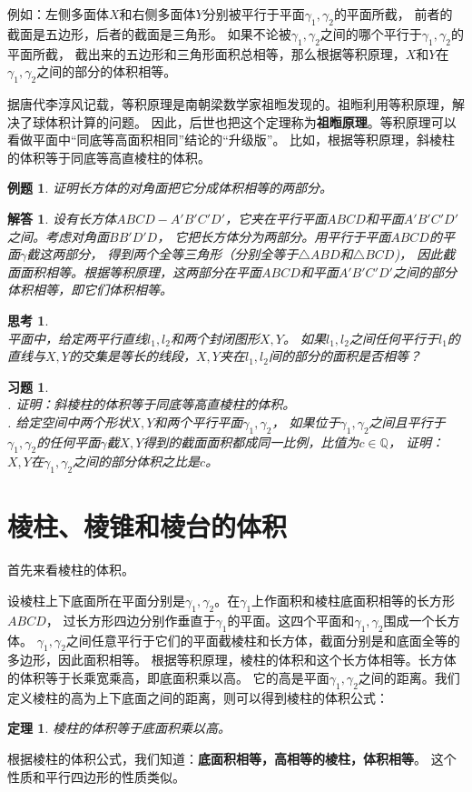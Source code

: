 \documentclass[12pt,UTF8]{ctexbook}
\newtheorem{tm}{定理}[section]
\newtheorem{et}{例题}[section]
\newtheorem{sk}{思考}[section]
\newtheorem*{so}{解答}
\newtheorem{xt}{习题}[section]
\begin{document}
例如：左侧多面体$X$和右侧多面体$Y$分别被平行于平面$\gamma_1,\gamma_2$的平面所截，
前者的截面是五边形，后者的截面是三角形。
如果不论被$\gamma_1,\gamma_2$之间的哪个平行于$\gamma_1,\gamma_2$的平面所截，
截出来的五边形和三角形面积总相等，那么根据等积原理，$X$和$Y$在$\gamma_1,\gamma_2$之间的部分的体积相等。

据唐代李淳风记载，等积原理是南朝梁数学家祖暅发现的。祖暅利用等积原理，解决了球体积计算的问题。
因此，后世也把这个定理称为\textbf{祖暅原理}。等积原理可以看做平面中“同底等高面积相同”结论的“升级版”。
比如，根据等积原理，斜棱柱的体积等于同底等高直棱柱的体积。
\begin{et}
    证明长方体的对角面把它分成体积相等的两部分。
\end{et}
\begin{so}
    设有长方体$ABCD-A'B'C'D'$，它夹在平行平面$ABCD$和平面$A'B'C'D'$之间。考虑对角面$BB'D'D$，
    它把长方体分为两部分。用平行于平面$ABCD$的平面$\gamma$截这两部分，
    得到两个全等三角形（分别全等于$\triangle ABD$和$\triangle BCD$)，
    因此截面面积相等。根据等积原理，这两部分在平面$ABCD$和平面$A'B'C'D'$之间的部分体积相等，即它们体积相等。
\end{so}
\begin{sk}
    \mbox{}\\
    平面中，给定两平行直线$l_1,l_2$和两个封闭图形$X,Y$。
    如果$l_1,l_2$之间任何平行于$l_1$的直线与$X,Y$的交集是等长的线段，$X,Y$夹在$l_1,l_2$间的部分的面积是否相等？
\end{sk}
\begin{xt}
    \mbox{}\\
    . 证明：斜棱柱的体积等于同底等高直棱柱的体积。\\
    . 给定空间中两个形状$X,Y$和两个平行平面$\gamma_1,\gamma_2$，
    如果位于$\gamma_1,\gamma_2$之间且平行于$\gamma_1,\gamma_2$的任何平面$\gamma$截$X,Y$得到的截面面积都成同一比例，比值为$c\in\mathbb{Q}$，
    证明：$X,Y$在$\gamma_1,\gamma_2$之间的部分体积之比是$c$。
\end{xt}

\section{棱柱、棱锥和棱台的体积}

首先来看棱柱的体积。

设棱柱上下底面所在平面分别是$\gamma_1,\gamma_2$。在$\gamma_1$上作面积和棱柱底面积相等的长方形$ABCD$，
过长方形四边分别作垂直于$\gamma_1$的平面。这四个平面和$\gamma_1,\gamma_2$围成一个长方体。
$\gamma_1,\gamma_2$之间任意平行于它们的平面截棱柱和长方体，截面分别是和底面全等的多边形，因此面积相等。
根据等积原理，棱柱的体积和这个长方体相等。长方体的体积等于长乘宽乘高，即底面积乘以高。
它的高是平面$\gamma_1,\gamma_2$之间的距离。我们定义棱柱的高为上下底面之间的距离，则可以得到棱柱的体积公式：
\begin{tm}\label{tm:3-2-0}
    棱柱的体积等于底面积乘以高。
\end{tm}
根据棱柱的体积公式，我们知道：\textbf{底面积相等，高相等的棱柱，体积相等}。
这个性质和平行四边形的性质类似。
\end{document}
